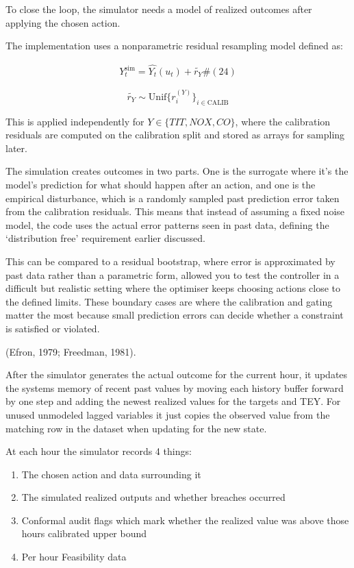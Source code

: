 \documentclass[11pt]{article}
\begin{document}
To close the loop, the simulator needs a model of realized outcomes
after applying the chosen action.

The implementation uses a nonparametric residual resampling model
defined as:

\[\begin{array}{r}
Y_{t}^{\text{sim}} = \widehat{Y_{t}}\left( u_{t} \right) + \widetilde{r_{Y}}\#(24)
\end{array}\]

\[\widetilde{r_{Y}} \sim \text{Unif\{}r_{i}^{(Y)}\text{\}}_{i \in \text{CALIB}}\]

This is applied independently for
\(Y\mathbf{\in \{}TIT\mathbf{,}NOX\mathbf{,}CO\}\), where the
calibration residuals are computed on the calibration split and stored
as arrays for sampling later.

The simulation creates outcomes in two parts. One is the surrogate where
it's the model's prediction for what should happen after an action, and
one is the empirical disturbance, which is a randomly sampled past
prediction error taken from the calibration residuals. This means that
instead of assuming a fixed noise model, the code uses the actual error
patterns seen in past data, defining the `distribution free' requirement
earlier discussed.

This can be compared to a residual bootstrap, where error is
approximated by past data rather than a parametric form, allowed you to
test the controller in a difficult but realistic setting where the
optimiser keeps choosing actions close to the defined limits. These
boundary cases are where the calibration and gating matter the most
because small prediction errors can decide whether a constraint is
satisfied or violated.

(Efron, 1979; Freedman, 1981).

After the simulator generates the actual outcome for the current hour,
it updates the systems memory of recent past values by moving each
history buffer forward by one step and adding the newest realized values
for the targets and TEY. For unused unmodeled lagged variables it just
copies the observed value from the matching row in the dataset when
updating for the new state.

At each hour the simulator records 4 things:

\begin{enumerate}
\def\labelenumi{\arabic{enumi})}
\item
  The chosen action and data surrounding it
\item
  The simulated realized outputs and whether breaches occurred
\item
  Conformal audit flags which mark whether the realized value was above
  those hours calibrated upper bound
\item
  Per hour Feasibility data
\end{enumerate}
\end{document}
